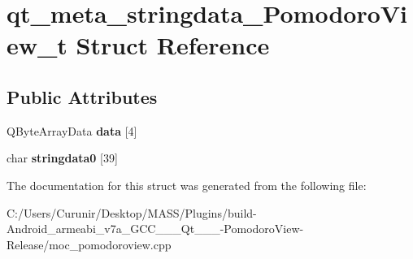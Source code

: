 \hypertarget{structqt__meta__stringdata___pomodoro_view__t}{}\section{qt\+\_\+meta\+\_\+stringdata\+\_\+\+Pomodoro\+View\+\_\+t Struct Reference}
\label{structqt__meta__stringdata___pomodoro_view__t}
\subsection*{Public Attributes}
\begin{DoxyCompactItemize}
\item 
\mbox{\label{structqt__meta__stringdata___pomodoro_view__t_a2a708fc9c807e0dcee6e6c7164c522a3}} 
Q\+Byte\+Array\+Data {\bfseries data} \mbox{[}4\mbox{]}
\item 
\mbox{\label{structqt__meta__stringdata___pomodoro_view__t_ad82032c0aa8c4d8ca8d7265a30c592d2}} 
char {\bfseries stringdata0} \mbox{[}39\mbox{]}
\end{DoxyCompactItemize}


The documentation for this struct was generated from the following file\+:\begin{DoxyCompactItemize}
\item 
C\+:/\+Users/\+Curunir/\+Desktop/\+M\+A\+S\+S/\+Plugins/build-\/\+Android\+\_\+armeabi\+\_\+v7a\+\_\+\+G\+C\+C\+\_\+\_\+\_\+\+Qt\+\_\+\_\+\_-\/\+Pomodoro\+View-\/\+Release/moc\+\_\+pomodoroview.\+cpp\end{DoxyCompactItemize}
